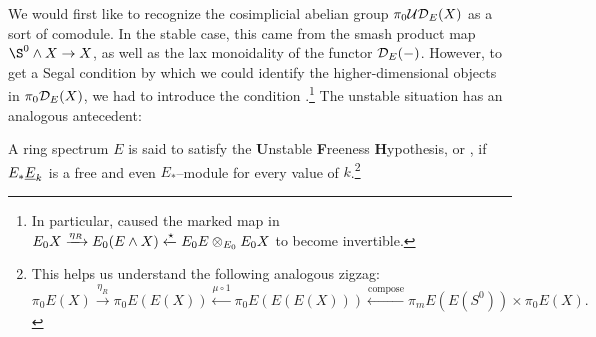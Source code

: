 We would first like to recognize the cosimplicial abelian group \(\pi_0 \mathcal{UD}_E(X)\) as a sort of comodule.  In the stable case, this came from the smash product map \(\S^0 \sm X \to X\), as well as the lax monoidality of the functor \(\mathcal{D}_E(-)\).  However, to get a Segal condition by which we could identify the higher-dimensional objects in \(\pi_0 \mathcal{D}_E(X)\), we had to introduce the condition .\footnote{In particular, {\FH} caused the marked map in \(E_0 X \xrightarrow{\eta_R} E_0(E \wedge X) \xleftarrow{\star} E_0 E \otimes_{E_0} E_0 X\) to become invertible.}  The unstable situation has an analogous antecedent:

\begin{definition}
A ring spectrum \(E\) is said to satisfy the \textbf{U}nstable \textbf{F}reeness \textbf{H}ypothesis, or \UFH, if \(E_* \underline{\smash{E}}_{k}\) is a free and even \(E_*\)--module for every value of \(k\).\footnote{This helps us understand the following analogous zigzag: \[\pi_0 E(X) \xrightarrow{\eta_R} \pi_0 E(E(X)) \xleftarrow{\mu \circ 1} \pi_0 E(E(E(X))) \xleftarrow{\mathrm{compose}} \pi_m E(E(S^0)) \times \pi_0 E(X).\]}
\end{definition}

